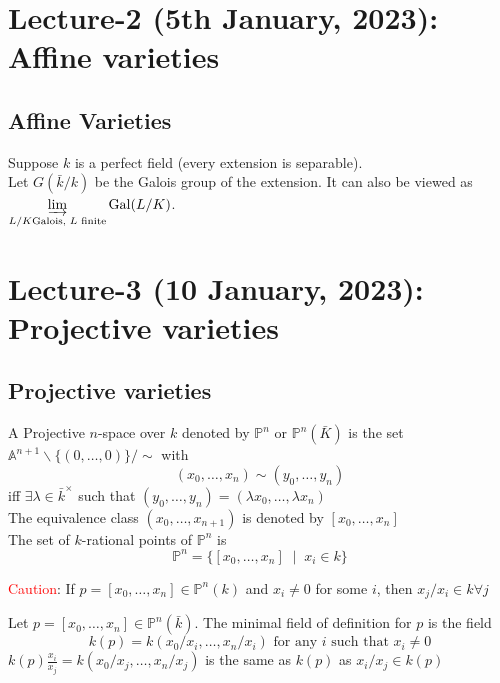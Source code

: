 \documentclass[oneside, 12pt, ]{scrbook}
\theoremstyle{theorem}
\begin{document}
\chapter{Lecture-2 (5th January, 2023): Affine varieties }

\section{Affine Varieties}

Suppose $k$ is a perfect field (every extension is separable). \\
Let $G(\bar{k}/k)$ be the Galois group of the extension. It can also be viewed as $\displaystyle{\varinjlim_{L/K \text{Galois, }L \text{ finite}} \mathrm{Gal}(L/K)}$. \\



\chapter{Lecture-3 (10 January, 2023): Projective varieties}

\section{Projective varieties}

\begin{definition}
A Projective $n$-space over $k$ denoted by $\mathbb{P}^n$ or $\mathbb{P}^{n}(\bar{K})$ is the set $\mathbb{A}^{n+1} \backslash \{(0,\hdots , 0)\} / \sim$ with  
$$(x_{0}, \hdots ,x_{n}) \sim (y_{0},\hdots ,y_{n})$$ iff $\exists \lambda \in \bar{k}^{\times}$ such that $(y_{0},\hdots ,y_{n}) = (\lambda x_{0},\hdots ,\lambda x_{n})$\\
The equivalence class $(x_{0},\hdots ,x_{n+1})$ is denoted by $[x_{0},\hdots ,x_{n}]$\\
The set of $k$-rational points of $\mathbb{P}^n$ is $$\mathbb{P}^n = \{[x_{0}, \hdots , x_{n}]\; \mid \; x_{i} \in k\}$$
\end{definition}

\textcolor{red}{Caution}: If $p = [x_{0},\hdots ,x_{n}] \in \mathbb{P}^n(k)$ and $x_{i} \neq 0$ for some $i$, then $x_{j}/x_{i} \in k \forall j$

\begin{definition}
Let $p = [x_{0},\hdots ,x_{n}] \in \mathbb{P}^n(\bar{k})$. The minimal field of definition for $p$ is the field $$k(p) = k(x_{0}/x_{i},\hdots ,x_{n}/x_{i}) \text{ for any } i \text{ such that } x_{i} \neq 0$$
$k(p) \frac{x_{i}}{x_{j}} = k(x_{0}/x_{j},\hdots ,x_{n}/x_{j})$ is the same as $k(p)$ as $x_{i}/x_{j} \in k(p)$
\end{definition}  
\end{document}
